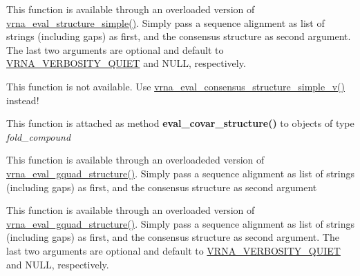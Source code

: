 \begin{DoxyRefList}
\item[\label{wrappers__wrappers000055}%
\Hypertarget{wrappers__wrappers000055}%
Global \hyperlink{group__eval_gad88927c62ab0a8b534e078e44be1b36e}{vrna\+\_\+eval\+\_\+consensus\+\_\+structure\+\_\+simple\+\_\+v} (const char $\ast$$\ast$alignment, const char $\ast$structure, int verbosity\+\_\+level, F\+I\+LE $\ast$file)]This function is available through an overloaded version of \hyperlink{group__eval_ga7e5273464b775d4130245681312c1369}{vrna\+\_\+eval\+\_\+structure\+\_\+simple()}. Simply pass a sequence alignment as list of strings (including gaps) as first, and the consensus structure as second argument. The last two arguments are optional and default to \hyperlink{group__eval_gaf4afe19780b61b4962c613bde324128b}{V\+R\+N\+A\+\_\+\+V\+E\+R\+B\+O\+S\+I\+T\+Y\+\_\+\+Q\+U\+I\+ET} and N\+U\+LL, respectively.  
\item[\label{wrappers__wrappers000050}%
\Hypertarget{wrappers__wrappers000050}%
Global \hyperlink{group__eval_ga1c07851f6b665c3461a19e9e4eb33d26}{vrna\+\_\+eval\+\_\+consensus\+\_\+structure\+\_\+simple\+\_\+verbose} (const char $\ast$$\ast$alignment, const char $\ast$structure, F\+I\+LE $\ast$file)]This function is not available. Use \hyperlink{group__eval_gad88927c62ab0a8b534e078e44be1b36e}{vrna\+\_\+eval\+\_\+consensus\+\_\+structure\+\_\+simple\+\_\+v()} instead!  
\item[\label{wrappers__wrappers000035}%
\Hypertarget{wrappers__wrappers000035}%
Global \hyperlink{group__eval_ga6cea75c0eb9857fb59172be54cab09e0}{vrna\+\_\+eval\+\_\+covar\+\_\+structure} (vrna\+\_\+fold\+\_\+compound\+\_\+t $\ast$vc, const char $\ast$structure)]This function is attached as method {\bfseries eval\+\_\+covar\+\_\+structure()} to objects of type {\itshape fold\+\_\+compound}  
\item[\label{wrappers__wrappers000047}%
\Hypertarget{wrappers__wrappers000047}%
Global \hyperlink{group__eval_gaf09a326b3d57a4b30c27bd0e216198ac}{vrna\+\_\+eval\+\_\+gquad\+\_\+consensus\+\_\+structure} (const char $\ast$$\ast$alignment, const char $\ast$structure)]This function is available through an overloadeded version of \hyperlink{group__eval_ga3263504825ef4b523eba797c99921df4}{vrna\+\_\+eval\+\_\+gquad\+\_\+structure()}. Simply pass a sequence alignment as list of strings (including gaps) as first, and the consensus structure as second argument  
\item[\label{wrappers__wrappers000057}%
\Hypertarget{wrappers__wrappers000057}%
Global \hyperlink{group__eval_ga8abc794fc48d43268ced5e8cde017baa}{vrna\+\_\+eval\+\_\+gquad\+\_\+consensus\+\_\+structure\+\_\+v} (const char $\ast$$\ast$alignment, const char $\ast$structure, int verbosity\+\_\+level, F\+I\+LE $\ast$file)]This function is available through an overloaded version of \hyperlink{group__eval_ga3263504825ef4b523eba797c99921df4}{vrna\+\_\+eval\+\_\+gquad\+\_\+structure()}. Simply pass a sequence alignment as list of strings (including gaps) as first, and the consensus structure as second argument. The last two arguments are optional and default to \hyperlink{group__eval_gaf4afe19780b61b4962c613bde324128b}{V\+R\+N\+A\+\_\+\+V\+E\+R\+B\+O\+S\+I\+T\+Y\+\_\+\+Q\+U\+I\+ET} and N\+U\+LL, respectively.  

\end{DoxyRefList}
